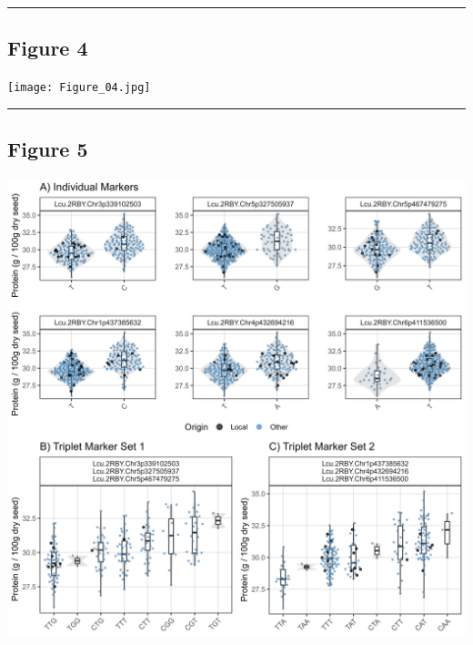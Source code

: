 \documentclass[
]{article}
\begin{document}
\begin{center}\rule{0.5\linewidth}{0.5pt}\end{center}

\hypertarget{figure-4}{%
\subsection{Figure 4}\label{figure-4}}

\texttt{[image: Figure\_04.jpg]}

\begin{center}\rule{0.5\linewidth}{0.5pt}\end{center}

\hypertarget{figure-5}{%
\subsection{Figure 5}\label{figure-5}}

\includegraphics{Figure_05a.jpg}
\end{document}
